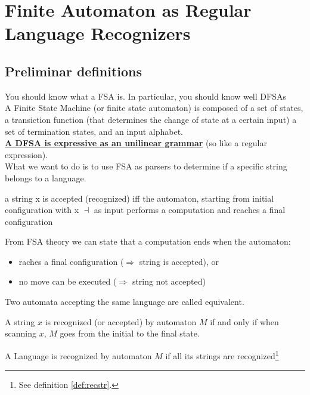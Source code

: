\chapter{Finite Automaton as Regular Language Recognizers}
	\section{Preliminar definitions}
	You should know what a FSA is. In particular, you should know well DFSAs\\
	A Finite State Machine (or finite state automaton) is composed of a set of states, a transiction function (that determines the change of state at a certain input) a 
	set of termination states, and an input alphabet.\\
	\textbf{\underline{A DFSA is expressive as an unilinear grammar}} (so like a regular expression).\\

	What we want to do is to use FSA as parsers to determine if a specific string belongs to a language.
	\begin{definition}
		a string x is accepted (recognized) iff the automaton,
		starting from initial configuration with x $\dashv$ as input
		performs a computation and reaches a final configuration
	\end{definition}

	From FSA theory we can state that a computation ends when the automaton:
	\begin{itemize}
		\item raches a final configuration ($\Rightarrow$ string is accepted), or
		\item no move can be executed ($\Rightarrow$ string not accepted)
	\end{itemize}

	\begin{definition}
		Two automata accepting the same language are called equivalent.
	\end{definition}

	\begin{definition}\label{def:recstr}
		A string $x$ is recognized (or accepted) by automaton $M$ if and only if when scanning $x$, $M$ goes from the initial to the final state.
	\end{definition}

	\begin{definition}
		A Language is recognized by automaton $M$ if all its strings are recognized\footnote{See definition \ref{def:recstr}.}
	\end{definition}

